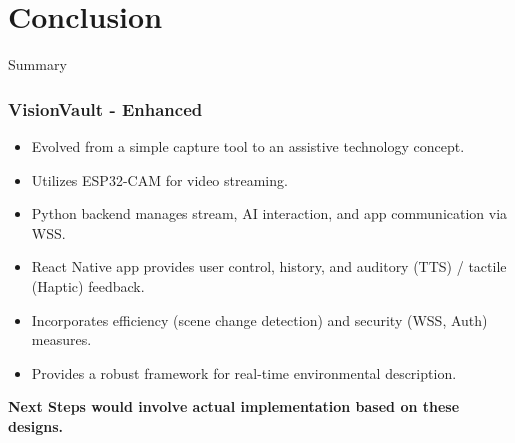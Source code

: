 \documentclass{beamer}
\begin{document}
\section{Conclusion}

\begin{frame}{Summary}
    \frametitle{VisionVault - Enhanced}
    \begin{itemize}
        \item Evolved from a simple capture tool to an assistive technology concept.
        \item Utilizes ESP32-CAM for video streaming.
        \item Python backend manages stream, AI interaction, and app communication via WSS.
        \item React Native app provides user control, history, and auditory (TTS) / tactile (Haptic) feedback.
        \item Incorporates efficiency (scene change detection) and security (WSS, Auth) measures.
        \item Provides a robust framework for real-time environmental description.
    \end{itemize}
     \vspace{1em}
     \textbf{Next Steps would involve actual implementation based on these designs.}
\end{frame}
\end{document}
